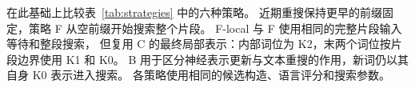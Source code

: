 在此基础上比较表~\ref{tab:strategies} 中的六种策略。
近期重搜保持更早的前缀固定，策略 F 从空前缀开始搜索整个片段。
F-local 与 F 使用相同的完整片段输入等待和整段搜索，
但复用 C 的最终局部表示：内部词位为 K2，末两个词位按片段边界使用 K1 和 K0。
B 用于区分神经表示更新与文本重搜的作用，新词仍以其自身 K0 表示进入搜索。
各策略使用相同的候选构造、语言评分和搜索参数。

\begin{table}[!htbp]
    \centering
    \papertablestyle
    \caption{文本序列解码策略。}
    \label{tab:strategies}
    
\end{table}
